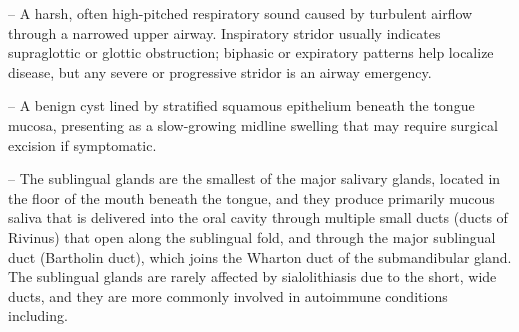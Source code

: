 -- A harsh, often high-pitched respiratory sound caused by turbulent airflow through a narrowed upper airway. Inspiratory stridor usually indicates supraglottic or glottic obstruction; biphasic or expiratory patterns help localize disease, but any severe or progressive stridor is an airway emergency.

-- A benign cyst lined by stratified squamous epithelium beneath the tongue mucosa, presenting as a slow-growing midline swelling that may require surgical excision if symptomatic.

-- The sublingual glands are the smallest of the major salivary glands, located in the floor of the mouth beneath the tongue, and they produce primarily mucous saliva that is delivered into the oral cavity through multiple small ducts (ducts of Rivinus) that open along the sublingual fold, and through the major sublingual duct (Bartholin duct), which joins the Wharton duct of the submandibular gland. The sublingual glands are rarely affected by sialolithiasis due to the short, wide ducts, and they are more commonly involved in autoimmune conditions including.

